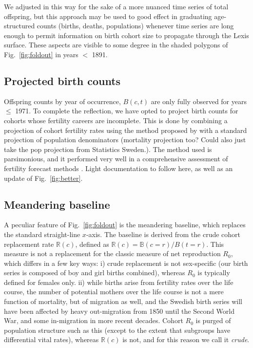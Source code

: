 We adjusted in this way for the sake of a more nuanced time series of total offspring, but this approach may be used to good effect in graduating age-structured counts (births, deaths, populations) whenever time series are long enough to permit information on birth cohort size to propagate through the Lexis surface. These aspects are visible to some degree in the shaded polygons of Fig.~\ref{fig:foldout} in years $<$ 1891.

\subsection{Projected birth counts}
\label{sec:proj}
Offspring counts by year of occurrence, $B(c,t)$ are only fully observed for years $\le$ 1971. To complete the reflection, we have opted to project birth counts for cohorts whose fertility careers are incomplete. This is done by combining a projection of cohort fertility rates using the method proposed by \citet{de1985time} with a standard projection of population denominators (mortality projection too? Could also just take the pop projection from Statistics Sweden.). The method used is parsimonious, and it performed very well in a comprehensive assessment of fertility forecast methods \citep{bohk2018forecast}. Light documentation to follow here, as well as an update of Fig.~\ref{fig:better}.

\subsection{Meandering baseline}
\label{sec:baseline}
A peculiar feature of Fig.~\ref{fig:foldout} is the meandering baseline, which replaces the standard straight-line $x$-axis. The baseline is derived from the crude cohort replacement rate $\mathbb{R}(c)$, defined as $\mathbb{R}(c) = \mathbb{B}(c=r) / B(t=r)$. This measure is not a replacement for the classic measure of net reproduction $R_0$, which differs in a few key ways: i) crude replacement is not sex-specific (our birth series is composed of boy and girl births combined), whereas $R_0$ is typically defined for females only. ii) while births arise from fertility rates over the life course, the number of potential mothers over the life course is not a mere function of mortality, but of migration as well, and the Swedish birth series will have been affected by heavy out-migration from 1850 until the Second World War, and some in-migration in more recent decades. Cohort $R_0$ is purged of population structure such as this (except to the extent that subgroups have differential vital rates), whereas $\mathbb{R}(c)$ is not, and for this reason we call it \emph{crude}.

